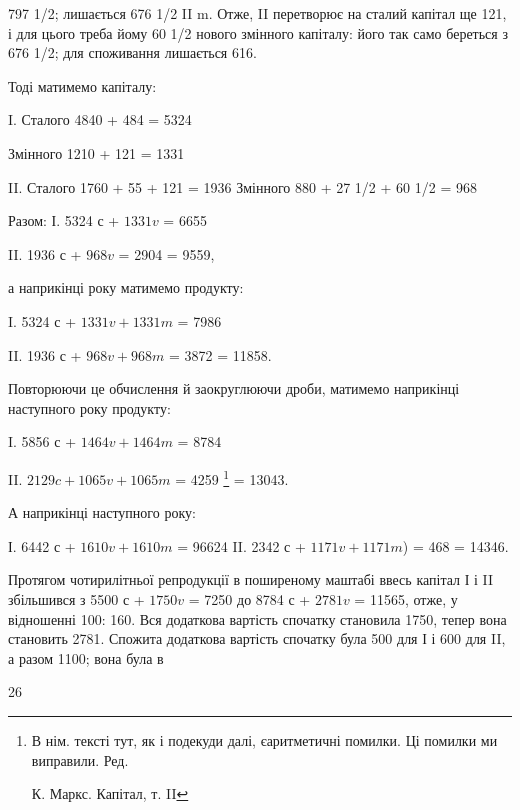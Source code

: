 \parcont{}  %
797 1/2; лишається 676 1/2 II m. Отже, II перетворює на сталий капітал
ще 121, і для цього треба йому 60 1/2 нового змінного капіталу: його
так само береться з 676 1/2; для споживання лишається 616.

Тоді матимемо капіталу:

I. Сталого 4840 + 484 = 5324

Змінного 1210 + 121 = 1331

II. Сталого 1760 + 55 + 121 = 1936
Змінного 880 + 27 1/2 + 60 1/2 = 968

Разом: І. 5324 с + $1331 v$ = 6655

II. 1936 с + $968 v$ = 2904
= 9559,

а наприкінці року матимемо продукту:

I.    5324 с + $1331 v + 1331 m$ = 7986

II.    1936 с + $968 v + 968 m$ = 3872
= 11858.

Повторюючи це обчислення й заокруглюючи дроби, матимемо наприкінці
наступного року продукту:

I.    5856 с + $1464 v + 1464 m$ = 8784

II.    $2129 c + 1065 v + 1065 m$ = 4259 \footnote*{
В нім. тексті тут, як і подекуди далі, єаритметичні помилки. Ці помилки ми
виправили. Ред.

К. Маркс. Капітал, т. II
}
= 13043.

А наприкінці наступного року:

І. 6442 с + $1610 v + 1610 m$ = 96624
II. 2342 с + $1171 v + 1171 m$) = 468
= 14346.

Протягом чотирилітньої репродукції в поширеному маштабі ввесь
капітал І і II збільшився з 5500 с + $1750 v$ = 7250 до 8784 с + $2781 v$ =
11565, отже, у відношенні 100: 160. Вся додаткова вартість спочатку
становила 1750, тепер вона становить 2781. Спожита додаткова вартість
спочатку була 500 для І і 600 для II, а разом 1100; вона була в

26
\parbreak{}  %
